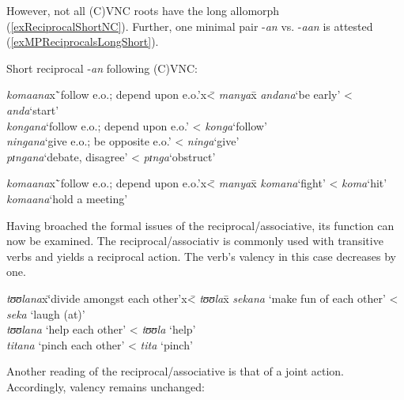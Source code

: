 However, not all (C)VNC roots have the long allomorph (\ref{exReciprocalShortNC}). Further, one minimal pair -\textit{an} vs. -\textit{aan} is attested (\ref{exMPReciprocalsLongShort}).
\pagebreak
\begin{exe}
	\ex \label{exReciprocalShortNC} Short reciprocal -\textit{an} following (C)VNC:
	\begin{tabbing}
		\textit{komaana}x\=`follow e.o.; depend upon e.o.'x\= < \textit{manya}x\=\kill%
		\textit{andana}\>`be early'\> < \textit{anda}\>`start'\\
		\textit{kongana}\>`follow e.o.; depend upon e.o.'\> < \textit{konga}\>\lq follow'\\
		\textit{ningana}\>`give e.o.; be opposite e.o.'\> < \textit{ninga}\>`give'\\
		\textit{pɪngana}\>`debate, disagree'\> < \textit{pɪnga}\>`obstruct'
	\end{tabbing}
	\ex \label{exMPReciprocalsLongShort}
	\begin{tabbing}
		\textit{komaana}x\=`follow e.o.; depend upon e.o.'x\= < \textit{manya}x\=\kill%
		\textit{komana}\>`fight'\> < \textit{koma}\>`hit' \\
		\textit{komaana}\>`hold a meeting'
	\end{tabbing}
\end{exe}

Having broached the formal issues of the reciprocal/associative, its function can now be examined. The reciprocal/associativ is commonly used with transitive verbs and yields a reciprocal action. The verb's valency in this case decreases by one.

\begin{exe}
	\ex
	\begin{tabbing}
		\textit{tʊʊlana}x\=\lq divide amongst each other'x\= < \textit{tʊʊla}x\=\kill%
		\textit{sekana} \> \lq make fun of each other' \> < \textit{seka} \> \lq laugh (at)'\\
		\textit{tʊʊlana} \> \lq help each other' \> < \textit{tʊʊla} \> \lq help'\\
		\textit{titana}\> \lq pinch each other' \> < \textit{tita} \> \lq pinch'
	\end{tabbing} 
\end{exe}

Another reading of the reciprocal/associative is that of a joint action. Accordingly, valency remains unchanged:

